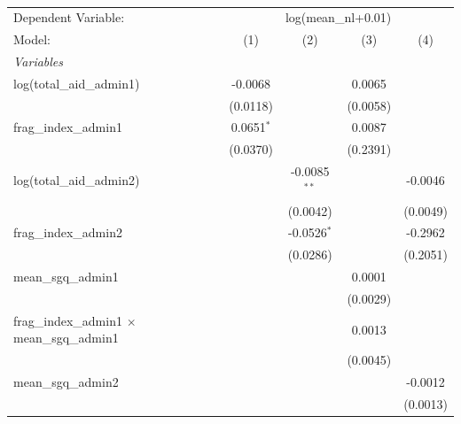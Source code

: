 \begingroup
\centering
\begin{table}[!htbp] \centering 
  \caption{} 
  \label{} 
\begin{tabular}{lcccc}
   \tabularnewline \midrule \midrule
   Dependent Variable: & \multicolumn{4}{c}{log(mean\_nl+0.01)}\\
   Model:                                              & (1)          & (2)            & (3)      & (4)\\  
   \midrule
   \emph{Variables}\\
   log(total\_aid\_admin1)                             & -0.0068      &                & 0.0065   &   \\   
                                                       & (0.0118)     &                & (0.0058) &   \\   
   frag\_index\_admin1                                 & 0.0651$^{*}$ &                & 0.0087   &   \\   
                                                       & (0.0370)     &                & (0.2391) &   \\   
   log(total\_aid\_admin2)                             &              & -0.0085$^{**}$ &          & -0.0046\\   
                                                       &              & (0.0042)       &          & (0.0049)\\   
   frag\_index\_admin2                                 &              & -0.0526$^{*}$  &          & -0.2962\\   
                                                       &              & (0.0286)       &          & (0.2051)\\   
   mean\_sgq\_admin1                                   &              &                & 0.0001   &   \\   
                                                       &              &                & (0.0029) &   \\   
   frag\_index\_admin1 $\times$ mean\_sgq\_admin1      &              &                & 0.0013   &   \\   
                                                       &              &                & (0.0045) &   \\   
   mean\_sgq\_admin2                                   &              &                &          & -0.0012\\   
                                                       &              &                &          & (0.0013)\\   

\end{tabular}
\end{table}
